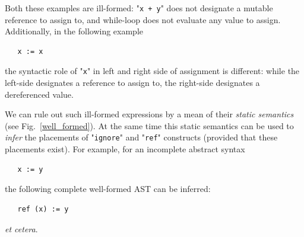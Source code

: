 \documentclass{article}
\newcommand{\withenv}[2]{{#1}\vdash{#2}}
\newcommand{\llang}[1]{\mbox{\lstinline[mathescape]|#1|}}
\newcommand{\primi}[2]{\mathbf{#1}\;{#2}}
\theoremstyle{definition}
\begin{document}
Both these examples are ill-formed: "\llang{x + y}" does not designate a mutable reference to assign to, and while-loop does not
evaluate any value to assign. Additionally, in the following example

\begin{lstlisting}
   x := x
\end{lstlisting}

the syntactic role of "\llang{x}" in left and right side of assignment is different: while the left-side designates a reference to assign to,
the right-side designates a dereferenced value.

We can rule out such ill-formed expressions by a mean of their \emph{static semantics} (see Fig.~\ref{well_formed}). At the same time this static
semantics can be used to \emph{infer} the placements of "\llang{ignore}" and "\llang{ref}" constructs (provided that these placements exist). For example,
for an incomplete abstract syntax

\begin{lstlisting}
   x := y
\end{lstlisting}

the following complete well-formed AST can be inferred:

\begin{lstlisting}
   ref (x) := y
\end{lstlisting}

\emph{et cetera}.

\ifdefined\Ref
  \renewcommand{\Ref}{\primi{Ref}{}}
\else 
  \newcommand{\Ref}{\primi{Ref}{}}
\fi
\newcommand{\Val}{\primi{Val}{}}
\newcommand{\Void}{\primi{Void}{}}

\renewcommand{\withenv}[2]{{#2}:{#1}}
\end{document}
